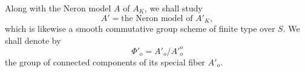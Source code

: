 Along with the Neron model $A$ of $A_K$, we shall study
\begin{equation}\tag{1.1.7}
 A'=\text{the Neron model of }A'_K,
\end{equation}
which is likewise a smooth commutative group scheme of finite type over
$S$.  We shall denote by
\begin{equation}\tag{1.1.8}
 \Phi'_o=A'_o/{A'}_o^o
\end{equation}
the group of connected components of its special fiber $A'_o$.
